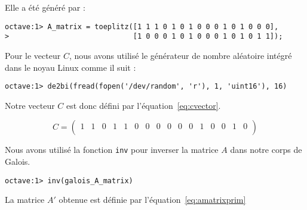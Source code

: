 \documentclass[12pt,a4paper]{report}
\begin{document}
Elle a été généré par :

\begin{verbatim}
octave:1> A_matrix = toeplitz([1 1 1 0 1 0 1 0 0 0 1 0 1 0 0 0],
>                             [1 0 0 0 1 0 1 0 0 0 1 0 1 0 1 1]);
\end{verbatim}

Pour le vecteur $C$, nous avons utilisé le générateur de nombre aléatoire intégré dans le
noyau Linux comme il suit :

\begin{verbatim}
octave:1> de2bi(fread(fopen('/dev/random', 'r'), 1, 'uint16'), 16)
\end{verbatim}

Notre vecteur $C$ est donc défini par l'équation~\ref{eq:cvector}.

\begin{equation}
\label{eq:cvector}
C = \left(
\begin{array}{cccccccccccccccc}
1 & 1 & 0 & 1 & 1 & 0 & 0 & 0 & 0 & 0 & 0 & 1 & 0 & 0 & 1 & 0 \\
\end{array}
\right)
\end{equation}

Nous avons utilisé la fonction \verb|inv| pour inverser la matrice $A$ dans
notre corps de Galois.

\begin{verbatim}
octave:1> inv(galois_A_matrix)
\end{verbatim}

La matrice $A'$ obtenue est définie par l'équation~\ref{eq:amatrixprim}
\end{document}
